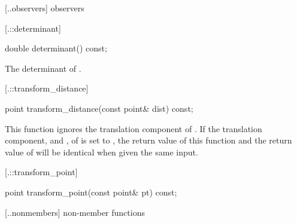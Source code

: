  [\iotwod.\matrixtwod.observers] { observers}

 [\iotwod.\matrixtwod::determinant] {}
%
%
\begin{itemdecl}
double determinant() const;
\end{itemdecl}
\begin{itemdescr}
	\pnum
	\returns
	The determinant of .
\end{itemdescr}

 [\iotwod.\matrixtwod::transform_distance] 
{}
%
%
\begin{itemdecl}
point transform_distance(const point& dist) const;
\end{itemdecl}
\begin{itemdescr}
	\pnum
	\returns
	
	\pnum
	\notes
	This function ignores the translation component of . If the 
	translation component,  and , of  is set 
	to , the return value of this function and the return 
	value of  will be identical when given the 
	same input.
\end{itemdescr}

 [\iotwod.\matrixtwod::transform_point] 
{}
%
%
\begin{itemdecl}
point transform_point(const point& pt) const;
\end{itemdecl}
\begin{itemdescr}
	\pnum
	\returns
\end{itemdescr}

 [\iotwod.\matrixtwod.nonmembers] { non-member functions}

